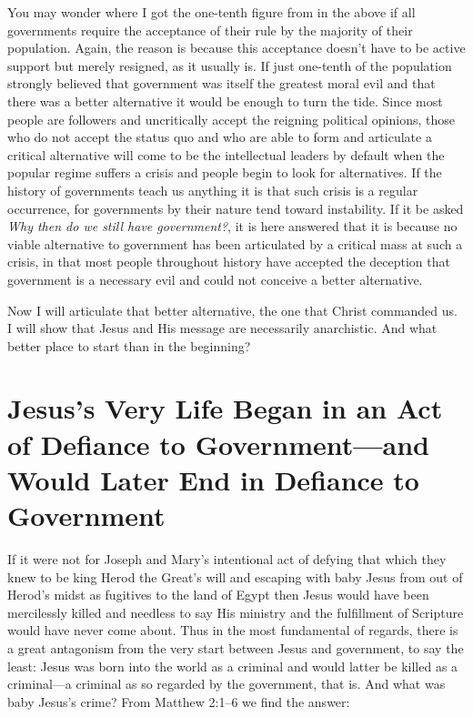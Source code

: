 \documentclass[letterpaper,12pt]{article}
\begin{document}
You may wonder where I got the one-tenth figure from in the above if all governments require the acceptance of their rule by the majority of their population. Again, the reason is because this acceptance doesn't have to be active support but merely resigned, as it usually is. If just one-tenth of the population strongly believed that government was itself the greatest moral evil and that there was a better alternative it would be enough to turn the tide. Since most people are followers and uncritically accept the reigning political opinions, those who do not accept the status quo and who are able to form and articulate a critical alternative will come to be the intellectual leaders by default when the popular regime suffers a crisis and people begin to look for alternatives. If the history of governments teach us anything it is that such crisis is a regular occurrence, for governments by their nature tend toward instability. If it be asked \emph{Why then do we still have government?}, it is here answered that it is because no viable alternative to government has been articulated by a critical mass at such a crisis, in that most people throughout history have accepted the deception that government is a necessary evil and could not conceive a better alternative.

Now I will articulate that better alternative, the one that Christ commanded us. I will show that Jesus and His message are necessarily anarchistic. And what better place to start than in the beginning?

\section{Jesus's Very Life Began in an Act of Defiance to Government---and Would Later End in Defiance to Government}
\label{sec:JesusSVeryLifeBeganInAnActOfDefianceToGovernmentAndWouldLaterEndInDefianceToGovernment}

If it were not for Joseph and Mary's intentional act of defying that which they knew to be king Herod the Great's will and escaping with baby Jesus from out of Herod's midst as fugitives to the land of Egypt then Jesus would have been mercilessly killed and needless to say His ministry and the fulfillment of Scripture would have never come about. Thus in the most fundamental of regards, there is a great antagonism from the very start between Jesus and government, to say the least: Jesus was born into the world as a criminal and would latter be killed as a criminal---a criminal as so regarded by the government, that is. And what was baby Jesus's crime? From Matthew 2:1--6 we find the answer:
\end{document}
